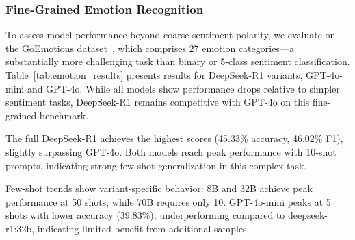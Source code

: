 \documentclass{IEEEcsmag}
\begin{document}
\vspace{-15pt}
\subsubsection{\textbf{Fine-Grained Emotion Recognition}}

To assess model performance beyond coarse sentiment polarity, we evaluate on the GoEmotions dataset~\cite{demszky2020goemotions}, which comprises 27 emotion categories—a substantially more challenging task than binary or 5-class sentiment classification.
Table~\ref{tab:emotion_results} presents results for DeepSeek-R1 variants, GPT-4o-mini and GPT-4o. While all models show performance drops relative to simpler sentiment tasks, DeepSeek-R1 remains competitive with GPT-4o on this fine-grained benchmark.

\begin{table}[ht]
\centering
\small
{}
\caption{Performance on GoEmotions dataset (27-class emotion recognition) at optimal few-shot settings}
\label{tab:emotion_results}
\end{table}

The full DeepSeek-R1 achieves the highest scores (45.33\% accuracy, 46.02\% F1), slightly surpassing GPT-4o. Both models reach peak performance with 10-shot prompts, indicating strong few-shot generalization in this complex task.

Few-shot trends show variant-specific behavior: 8B and 32B achieve peak performance at 50 shots, while 70B requires only 10. GPT-4o-mini peaks at 5 shots with lower accuracy (39.83\%), underperforming compared to deepseek-r1:32b, indicating limited benefit from additional samples.
\end{document}
